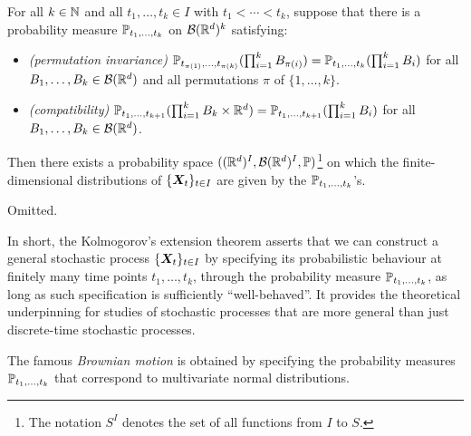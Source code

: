 \begin{enumerate}
\begin{theorem}
\label{thm:kolmogorov-extension}
For all \(k\in\mathbb{N}\) and all \(t_1,\dotsc,t_k\in I\) with \(t_1<\dotsb<t_k\),
suppose that there is a probability measure \(\mathbb{P}_{t_1,\dotsc,t_k}\) on
\(\mathcal{B}(\mathbb{R}^d)^{k}\) satisfying:
\begin{itemize}
\item \emph{(permutation invariance)} \(\mathbb{P}_{t_{\pi(1)},\dotsc,t_{\pi(k)}}(\prod_{i=1}^{k}B_{\pi(i)})
=\mathbb{P}_{t_1,\dotsc,t_k}(\prod_{i=1}^{k}B_i)\) for all
\(B_1,\dotsc,B_k\in\mathcal{B}(\mathbb{R}^d)\) and all permutations \(\pi\) of \(\{1,\dotsc,k\}\).
\item \emph{(compatibility)} \(\mathbb{P}_{t_1,\dotsc,t_{k+1}}(\prod_{i=1}^{k}B_k\times\mathbb{R}^d)
=\mathbb{P}_{t_1,\dotsc,t_{k+1}}(\prod_{i=1}^{k}B_i)\) for all
\(B_1,\dotsc,B_k\in\mathcal{B}(\mathbb{R}^d)\).
\end{itemize}
Then there exists a probability space
\(((\mathbb{R}^d)^{I},\mathcal{B}(\mathbb{R}^d)^{I},\mathbb{P})\)\footnote{The notation \(S^I\)
denotes the set of all functions from \(I\) to \(S\).} on which the
finite-dimensional distributions of \(\{\bm{X}_t\}_{t\in I}\) are given by
the \(\mathbb{P}_{t_1,\dotsc,t_k}\)'s.
\end{theorem}
\begin{pf}
Omitted.
\end{pf}

In short, the Kolmogorov's extension theorem asserts that we can construct a
general stochastic process \(\{\bm{X}_t\}_{t\in I}\) by specifying its
probabilistic behaviour at finitely many time points \(t_1,\dotsc,t_k\),
through the probability measure \(\mathbb{P}_{t_1,\dotsc,t_k}\), as long as such
specification is sufficiently ``well-behaved''. It provides the theoretical
underpinning for studies of stochastic processes that are more general than
just discrete-time stochastic processes.
\begin{note}
The famous \emph{Brownian motion} is obtained by specifying the probability
measures \(\mathbb{P}_{t_1,\dotsc,t_k}\) that correspond to multivariate normal
distributions.
\end{note}
\end{enumerate}
